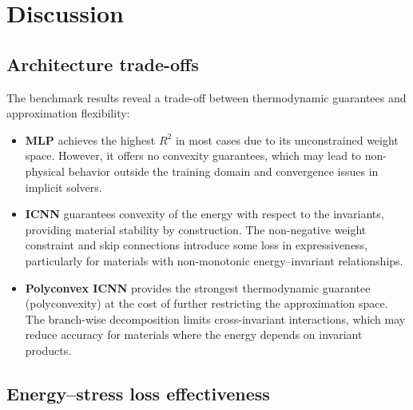\section{Discussion}
\label{sec:discussion}

\subsection{Architecture trade-offs}
\label{sec:discussion:tradeoffs}

The benchmark results reveal a trade-off between thermodynamic guarantees and
approximation flexibility:

\begin{itemize}
  \item \textbf{MLP} achieves the highest $R^2$ in most cases due to its
    unconstrained weight space.  However, it offers no convexity guarantees,
    which may lead to non-physical behavior outside the training domain and
    convergence issues in implicit solvers.

  \item \textbf{ICNN} guarantees convexity of the energy with respect to the
    invariants, providing material stability by construction.  The
    non-negative weight constraint and skip connections introduce some loss in
    expressiveness, particularly for materials with non-monotonic
    energy--invariant relationships.

  \item \textbf{Polyconvex ICNN} provides the strongest thermodynamic
    guarantee (polyconvexity) at the cost of further restricting the
    approximation space.  The branch-wise decomposition limits cross-invariant
    interactions, which may reduce accuracy for materials where the energy
    depends on invariant products.
\end{itemize}


\subsection{Energy--stress loss effectiveness}
\label{sec:discussion:loss}

